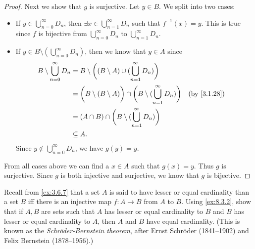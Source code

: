 \begin{proof}
  Next we show that \(g\) is surjective.
  Let \(y \in B\).
  We split into two cases:
  \begin{itemize}
    \item If \(y \in \bigcup_{n = 0}^\infty D_n\), then \(\exists x \in \bigcup_{n = 1}^\infty D_n\) such that \(f^{-1}(x) = y\).
          This is true since \(f\) is bijective from \(\bigcup_{n = 0}^\infty D_n\) to \(\bigcup_{n = 1}^\infty D_n\).
    \item If \(y \in B \setminus (\bigcup_{n = 0}^\infty D_n)\), then we know that \(y \in A\) since
          \begin{align*}
            B \setminus \bigcup_{n = 0}^\infty D_n & = B \setminus \bigg((B \setminus A) \cup (\bigcup_{n = 1}^\infty D_n)\bigg)                                          \\
                                                   & = \bigg(B \setminus (B \setminus A)\bigg) \cap \bigg(B \setminus (\bigcup_{n = 1}^\infty D_n)\bigg) &  & \by{3.1.28} \\
                                                   & = (A \cap B) \cap \bigg(B \setminus (\bigcup_{n = 1}^\infty D_n)\bigg)                                               \\
                                                   & \subseteq A.
          \end{align*}
          Since \(y \notin \bigcup_{n = 0}^\infty D_n\), we have \(g(y) = y\).
  \end{itemize}
  From all cases above we can find a \(x \in A\) such that \(g(x) = y\).
  Thus \(g\) is surjective.
  Since \(g\) is both injective and surjective, we know that \(g\) is bijective.
\end{proof}

\begin{ex}\label{ex:8.3.3}
  Recall from \cref{ex:3.6.7} that a set \(A\) is said to have lesser or equal cardinality than a set \(B\) iff there is an injective map \(f : A \to B\) from \(A\) to \(B\).
  Using \cref{ex:8.3.2}, show that if \(A, B\) are sets such that \(A\) has lesser or equal cardinality to \(B\) and \(B\) has lesser or equal cardinality to \(A\), then \(A\) and \(B\) have equal cardinality.
  (This is known as the \emph{Schröder-Bernstein theorem}, after Ernst Schröder (1841--1902) and Felix Bernstein (1878--1956).)
\end{ex}

